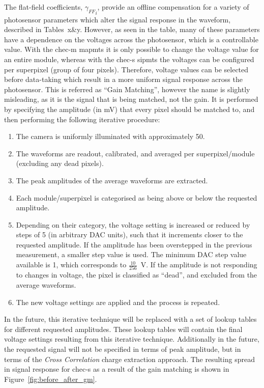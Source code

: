 The flat-field coefficients, ${\gamma_{FF}}_i$, provide an offline compensation for a variety of photosensor parameters which alter the signal response in the waveform, described in Tables~x\&y. However, as seen in the table, many of these parameters have a dependence on the voltages across the photosensor, which is a controllable value. With the \gls{chec-m} \glspl{mapmt} it is only possible to change the voltage value for an entire module, whereas with the \gls{chec-s} \glspl{sipmt} the voltages can be configured per superpixel (group of four pixels). Therefore, voltage values can be selected before data-taking which result in a more uniform signal response across the photosensor. This is referred as ``Gain Matching'', however the name is slightly misleading, as it is the signal that is being matched, not the gain. It is performed by specifying the amplitude (in \si{mV}) that every pixel should be matched to, and then performing the following iterative procedure:
\begin{enumerate}
	\item The camera is uniformly illuminated with approximately \SI{50}{\pe}.
	\item The waveforms are readout, calibrated, and averaged per superpixel/module (excluding any dead pixels).
    \item The peak amplitudes of the average waveforms are extracted.
    \item Each module/superpixel is categorised as being above or below the requested amplitude.
    \item Depending on their category, the voltage setting is increased or reduced by steps of 5 (in arbitrary DAC units), such that it increments closer to the requested amplitude. If the amplitude has been overstepped in the previous measurement, a smaller step value is used. The minimum DAC step value available is 1, which corresponds to $\frac{10}{256}$~V. If the amplitude is not responding to changes in voltage, the pixel is classified as ``dead'', and excluded from the average waveforms.
    \item The new voltage settings are applied and the process is repeated.
\end{enumerate}

In the future, this iterative technique will be replaced with a set of lookup tables for different requested amplitudes. These lookup tables will contain the final voltage settings resulting from this iterative technique. Additionally in the future, the requested signal will not be specified in terms of peak amplitude, but in terms of the \textit{Cross Correlation} charge extraction approach. The resulting spread in signal response for \gls{chec-s} as a result of the gain matching is shown in Figure~\ref{fig:before_after_gm}.

